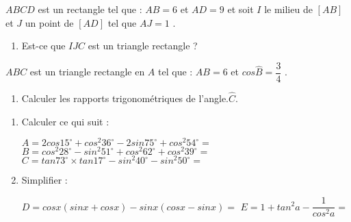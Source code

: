 \documentclass[a4paper,12pt]{article}
\begin{document}
\devoir[ds=true,num=3 ,niv=3 , date=12/01/2023 ,prv=true]


\begin{exo}[8]
$ABCD$ est un rectangle tel que : $AB=6 $ et  $AD=9 $ et soit  $I$ le milieu de $[AB]$ et $J$ un point de  $[AD]$ tel que $AJ=1 $ .
\begin{enumerate}
\item Est-ce que  $IJC$ est un triangle rectangle ?
\end{enumerate}
\end{exo}

\begin{exo}[7]
$ABC$ est un triangle rectangle en $A$ tel que : $AB=6$ et $cos\widehat{B}=\dfrac{3}{4}$ .
\begin{enumerate}
%
%
\item Calculer les rapports trigonométriques de l'angle.$\widehat{C}$.
\end{enumerate}
\end{exo}

\begin{exo}[5]
\begin{enumerate}
\item Calculer ce qui suit :

$A=2cos15^{\circ}+cos^{2}36^{\circ}-2sin75^{\circ}+cos^{2}54^{\circ}=$\anserline[2]
$B=cos^{2}28^{\circ}-sin^{2}51^{\circ}+cos^{2}62^{\circ}+cos^{2}39^{\circ}= $\anserline[2]
$C=tan73^{\circ}\times tan17^{\circ}-sin^{2}40^{\circ}-sin^{2}50^{\circ} =$\anserline[2]\vspace{-10pt}
\item Simplifier :

$D=cosx(sinx+cosx)-sinx(cosx-sinx)  =$ \anserline[3]
$E= 1+tan^{2}a-\dfrac{1}{cos^{2}a}=$\anserline[3]
\end{enumerate}
\end{exo}
\end{document}
